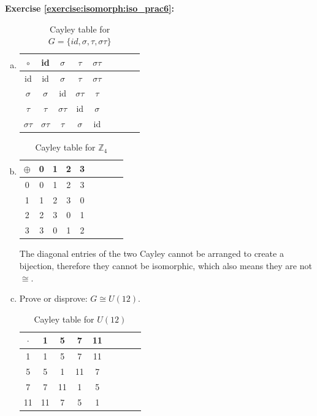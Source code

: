 \noindent\textbf{Exercise \ref{exercise:isomorph:iso_prac6}:}
\begin{enumerate}[(a)]
\item
\begin{table}[H]
\caption{Cayley table for $G =\{id, \sigma, \tau, \sigma\tau\}$}
{\small
\begin{center}
\begin{tabular}{c|cccccccc}
$\circ $ & id & $\sigma$ & $\tau$ & $\sigma\tau$  \\
\hline
id        & id & $\sigma$ & $\tau$  & $\sigma\tau$  \\
$\sigma$       & $\sigma$ & id & $\sigma\tau$ & $\tau$  \\
$\tau$      & $\tau$ & $\sigma\tau$ & id & $\sigma$ \\
$\sigma\tau$      & $\sigma\tau$  & $\tau$ & $\sigma$ & id \\
\end{tabular}
\end{center}
}
\end{table}

\item
\begin{table}[H]
\caption{Cayley table for ${\mathbb Z}_4$}
{\small
\begin{center}
\begin{tabular}{c|cccccccc}
$\oplus$ & 0 & 1 & 2 & 3  \\
\hline
0        & 0 & 1 & 2 & 3  \\
1       & 1 & 2 & 3 & 0  \\
2       & 2 & 3 & 0 & 1 \\
3       & 3 & 0 & 1 & 2 \\
\end{tabular}
\end{center}
}
\end{table}
The diagonal entries of the two Cayley cannot be arranged to create a bijection, therefore they cannot be isomorphic, which also means they are not $\cong$.

\item
Prove or disprove: $G \cong U(12)$.
\begin{table}[H]
\caption{Cayley table for $U(12)$}
{\small
\begin{center}
\begin{tabular}{c|cccccccc}
$\cdot$ & 1 & 5 & 7 & 11  \\
\hline
1        & 1 & 5 & 7 & 11  \\
5       & 5 & 1 & 11 & 7 \\
7       & 7 & 11 & 1 & 5  \\
11      & 11 & 7 & 5 & 1 \\
\end{tabular}
\end{center}
}
\end{table}
\end{enumerate}
